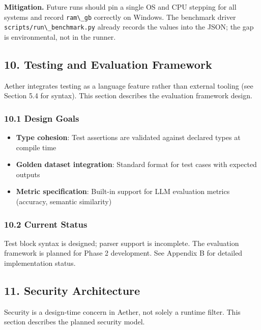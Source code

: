 \documentclass[
]{article}
\newcommand{\passthrough}[1]{#1}
\providecommand{\tightlist}{%
  \setlength{\itemsep}{0pt}\setlength{\parskip}{0pt}}
\begin{document}
\textbf{Mitigation.} Future runs should pin a single OS and CPU stepping
for all systems and record \passthrough{\lstinline!ram\_gb!} correctly
on Windows. The benchmark driver
\passthrough{\lstinline!scripts/run\_benchmark.py!} already records the
values into the JSON; the gap is environmental, not in the runner.

\subsection{10. Testing and Evaluation
Framework}\label{testing-and-evaluation-framework}

Aether integrates testing as a language feature rather than external
tooling (see Section 5.4 for syntax). This section describes the
evaluation framework design.

\subsubsection{10.1 Design Goals}\label{design-goals}

\begin{itemize}
\tightlist
\item
  \textbf{Type cohesion}: Test assertions are validated against declared
  types at compile time
\item
  \textbf{Golden dataset integration}: Standard format for test cases
  with expected outputs
\item
  \textbf{Metric specification}: Built-in support for LLM evaluation
  metrics (accuracy, semantic similarity)
\end{itemize}

\subsubsection{10.2 Current Status}\label{current-status}

Test block syntax is designed; parser support is incomplete. The
evaluation framework is planned for Phase 2 development. See Appendix B
for detailed implementation status.

\subsection{11. Security Architecture}\label{security-architecture}

Security is a design-time concern in Aether, not solely a runtime
filter. This section describes the planned security model.
\end{document}
